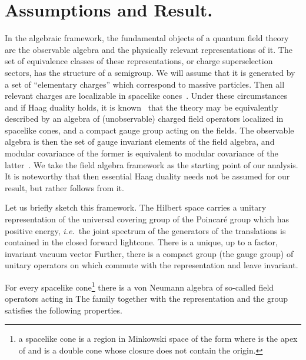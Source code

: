 \documentclass[a4paper,reqno,11pt]{amsart}
\theoremstyle{plain}
\theoremstyle{definition}
\numberwithin{equation}{section}
\providecommand{\Bb}{\mathbb{R}}
\providecommand{\F}{{\mathcal F}}
\providecommand{\calH}{{\mathcal H}}
\providecommand{\calO}{{\mathcal O}}
\providecommand{\calC}{{\mathcal C}}
\providecommand{\Potild}{\tilde{P}_+^{\uparrow}}
\providecommand{\cone}{\calC}   %
\begin{document}
\section{Assumptions and Result.}  \label{secAssRes} 
In the algebraic framework, the fundamental objects of a quantum field
theory are the observable algebra and the  physically relevant 
representations of it. The set of  equivalence classes of these 
representations, or charge superselection sectors, has the structure
of a semigroup. 
We will assume that it is generated by a set of 
``elementary charges'' which correspond to massive particles. 
Then all relevant charges are localizable in spacelike
cones~\cite{BuF}. Under these circumstances and if Haag duality holds, 
it is known~\cite{DR90} that the theory may be equivalently described
by an algebra of (unobservable) charged field operators localized in
spacelike cones, and a compact gauge group acting on the fields. 
The observable algebra is then the set of gauge invariant elements of 
the field algebra, and modular covariance of the former
is equivalent to modular covariance of the latter~\cite{Kuck,GL}. 
We take the field algebra framework as the starting point of our
analysis. It is noteworthy that then essential Haag duality 
needs not be assumed for our result, but rather follows from it. 

Let us briefly sketch this framework. 
The Hilbert space   
\myHighlight{$\calH$}\coordHE{} carries a unitary representation \coordHE{} of the universal covering group 
\myHighlight{$\Potild$}\coordHE{} of the Poincar\'e group which has positive energy, {\it
  i.e.\ }the joint spectrum of the generators \coordHE{} of the translations is
contained in the closed forward lightcone. There is a unique, up to a
factor,  invariant vacuum vector \coordHE{}  Further, there is a
compact group \coordHE{} (the gauge group) of unitary operators on \myHighlight{$\calH$}\coordHE{}
which commute with the representation \coordHE{} and leave \myHighlight{$\Omega$}\coordHE{}
invariant. 

For every spacelike cone\footnote{a spacelike cone is a region in
  Minkowski space of the form \myHighlight{$\cone=a+\cup_{\lambda>0}\lambda \calO,$}\coordHE{} where
  \myHighlight{$a\in\Bb^4$}\coordHE{} is the apex of \myHighlight{$\cone$}\coordHE{} and \myHighlight{$\calO$}\coordHE{} is a double cone whose
  closure does not contain the origin.} 
\myHighlight{$\cone$}\coordHE{} there is a von Neumann algebra \myHighlight{$\F(\cone)$}\coordHE{} of so-called field 
operators acting in \myHighlight{$\calH.$}\coordHE{} 
The family \myHighlight{$\cone\rightarrow\F(\cone),$}\coordHE{}
together with the representation \coordHE{} and the group \coordHE{} 
satisfies the following properties. 
\end{document}
